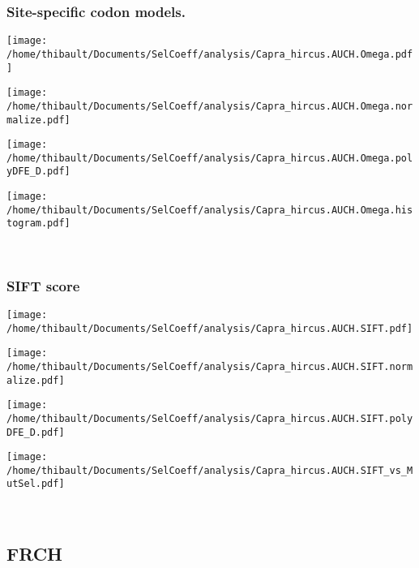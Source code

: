 \subsubsection*{Site-specific codon models.} 
\begin{minipage}{0.49\linewidth} 
\texttt{[image: /home/thibault/Documents/SelCoeff/analysis/Capra\_hircus.AUCH.Omega.pdf]} 
\end{minipage}
\begin{minipage}{0.49\linewidth} 
\texttt{[image: /home/thibault/Documents/SelCoeff/analysis/Capra\_hircus.AUCH.Omega.normalize.pdf]} 
\end{minipage}
\begin{minipage}{0.49\linewidth} 
\texttt{[image: /home/thibault/Documents/SelCoeff/analysis/Capra\_hircus.AUCH.Omega.polyDFE\_D.pdf]} 
\end{minipage}
\begin{minipage}{0.49\linewidth} 
\texttt{[image: /home/thibault/Documents/SelCoeff/analysis/Capra\_hircus.AUCH.Omega.histogram.pdf]} 
\end{minipage}
\\ 
\subsubsection*{SIFT score} 
\begin{minipage}{0.49\linewidth} 
\texttt{[image: /home/thibault/Documents/SelCoeff/analysis/Capra\_hircus.AUCH.SIFT.pdf]} 
\end{minipage}
\begin{minipage}{0.49\linewidth} 
\texttt{[image: /home/thibault/Documents/SelCoeff/analysis/Capra\_hircus.AUCH.SIFT.normalize.pdf]} 
\end{minipage}
\begin{minipage}{0.49\linewidth} 
\texttt{[image: /home/thibault/Documents/SelCoeff/analysis/Capra\_hircus.AUCH.SIFT.polyDFE\_D.pdf]} 
\end{minipage}
\begin{minipage}{0.49\linewidth} 
\texttt{[image: /home/thibault/Documents/SelCoeff/analysis/Capra\_hircus.AUCH.SIFT\_vs\_MutSel.pdf]} 
\end{minipage}
\\ 
\subsection{FRCH} 
 
